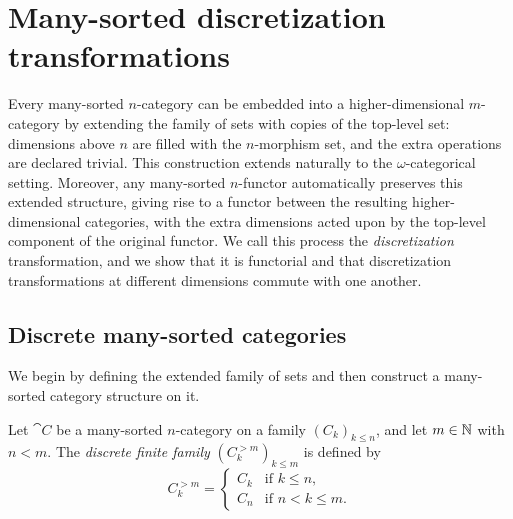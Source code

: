 \chapter{Many-sorted discretization transformations}
\label{ch:ms_discrete}

Every many-sorted $n$-category can be embedded into a higher-dimensional $m$-category by extending
the family of sets with copies of the top-level set: dimensions above $n$ are filled with the
$n$-morphism set, and the extra operations are declared trivial. This construction extends naturally
to the $\omega$-categorical setting. Moreover, any many-sorted $n$-functor automatically preserves
this extended structure, giving rise to a functor between the resulting higher-dimensional
categories, with the extra dimensions acted upon by the top-level component of the original functor.
We call this process the \emph{discretization} transformation, and we show that it is functorial and
that discretization transformations at different dimensions commute with one another.

\section{Discrete many-sorted categories}

We begin by defining the extended family of sets and then construct a many-sorted category structure
on it.

\begin{definition}
  \label{def:ManySortedDiscreteFamily}
  \leanok
  Let $\cat{C}$ be a many-sorted $n$-category on a family $(C_k)_{k \leq n}$, and let $m \in \mathbb{N}$
  with $n < m$. The \emph{discrete finite family} $(C^{>m}_k)_{k \leq m}$ is defined by
  \[
    C^{>m}_k =
    \begin{cases}
      C_k & \text{if } k \leq n, \\
      C_n & \text{if } n < k \leq m.
    \end{cases}
  \]
\end{definition}

